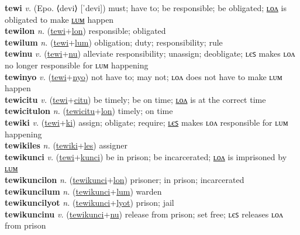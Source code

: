 \textbf{tewi} \textit{v.} (Epo. ⟨devi⟩ [ˈdevi])
must; have to; be responsible; be obligated; \hyperref[tewilon]{ʟᴏᴧ} is obligated to make \hyperref[tewilum]{ʟᴜᴍ} happen \label{tewi} \\
\textbf{tewilon} \textit{n.} (\hyperref[tewi]{tewi}+\hyperref[lon]{lon})
responsible; obligated \label{tewilon} \\
\textbf{tewilum} \textit{n.} (\hyperref[tewi]{tewi}+\hyperref[lum]{lum})
obligation; duty; responsibility; rule \label{tewilum} \\
\textbf{tewinu} \textit{v.} (\hyperref[tewi]{tewi}+\hyperref[nu]{nu})
alleviate responsibility; unassign; deobligate; ʟєꜱ makes ʟᴏᴧ no longer responsible for ʟᴜᴍ happening \label{tewinu} \\
\textbf{tewinyo} \textit{v.} (\hyperref[tewi]{tewi}+\hyperref[nyo]{nyo})
not have to; may not; ʟᴏᴧ does not have to make ʟᴜᴍ happen \label{tewinyo} \\
\textbf{tewicitu} \textit{v.} (\hyperref[tewi]{tewi}+\hyperref[citu]{citu})
be timely; be on time; \hyperref[tewicitulon]{ʟᴏᴧ} is at the correct time \label{tewicitu} \\
\textbf{tewicitulon} \textit{n.} (\hyperref[tewicitu]{tewicitu}+\hyperref[lon]{lon})
timely; on time \label{tewicitulon} \\
\textbf{tewiki} \textit{v.} (\hyperref[tewi]{tewi}+\hyperref[ki]{ki})
assign; obligate; require; \hyperref[tewikiles]{ʟєꜱ} makes ʟᴏᴧ responsible for ʟᴜᴍ happening \label{tewiki} \\
\textbf{tewikiles} \textit{n.} (\hyperref[tewiki]{tewiki}+\hyperref[les]{les})
assigner \label{tewikiles} \\
\textbf{tewikunci} \textit{v.} (\hyperref[tewi]{tewi}+\hyperref[kunci]{kunci})
be in prison; be incarcerated; \hyperref[tewikuncilon]{ʟᴏᴧ} is imprisoned by \hyperref[tewikuncilum]{ʟᴜᴍ} \label{tewikunci} \\
\textbf{tewikuncilon} \textit{n.} (\hyperref[tewikunci]{tewikunci}+\hyperref[lon]{lon})
prisoner; in prison; incarcerated \label{tewikuncilon} \\
\textbf{tewikuncilum} \textit{n.} (\hyperref[tewikunci]{tewikunci}+\hyperref[lum]{lum})
warden \label{tewikuncilum} \\
\textbf{tewikuncilyot} \textit{n.} (\hyperref[tewikunci]{tewikunci}+\hyperref[lyot]{lyot})
prison; jail \label{tewikuncilyot} \\
\textbf{tewikuncinu} \textit{v.} (\hyperref[tewikunci]{tewikunci}+\hyperref[nu]{nu})
release from prison; set free; ʟєꜱ releases ʟᴏᴧ from prison \label{tewikuncinu} \\
